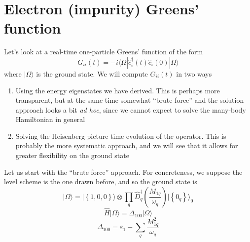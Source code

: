 \section{Electron (impurity) Greens' function}

Let's look at a real-time one-particle Greens' function of the form
\[ G_{ii}\left( t \right) =-i\langle \Omega |\hat{c}_{i}^{\dagger}\left( t \right) \hat{c}_i\left( 0 \right) |\Omega \rangle \]
where $|\Omega \rangle$ is the ground state. We will compute $G_{ii}(t)$ in two ways
\begin{enumerate}
    \item Using the energy eigenstates we have derived. This is perhaps more transparent, but at the same time somewhat ``brute force'' and the solution approach looks a bit \emph{ad hoc}, since we cannot expect to solve the many-body Hamiltonian in general
    \item Solving the Heisenberg picture time evolution of the operator. This is probably the more systematic approach, and we will see that it allows for greater flexibility on the ground state
\end{enumerate}

Let us start with the ``brute force'' approach. For concreteness, we suppose the level scheme is the one drawn before, and so the ground state is
\[ |\Omega \rangle =|\left\{ 1,0,0 \right\} \rangle \otimes \prod_q{\hat{D}_{q}^{\dagger}\left( \frac{M_{1q}}{\omega _q} \right) |\left\{ 0_q \right\} \rangle _0}\]
\[ \hat{H}|\Omega \rangle =\Delta _{100}|\Omega \rangle \]
\[ \Delta _{100}=\varepsilon _1-\sum_q{\frac{M_{1q}^{2}}{\omega _q}}\]
